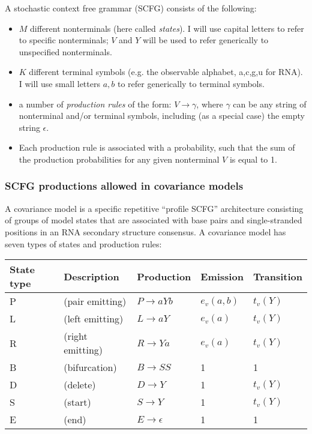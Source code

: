\documentclass[11pt]{article}
\begin{document}
A stochastic context free grammar (SCFG) consists of the following:

\begin{itemize}
\item $M$ different nonterminals (here called \emph{states}). I will use capital
      letters to refer to specific nonterminals; $V$ and $Y$ will be used
      to refer generically to unspecified nonterminals.
\item $K$ different terminal symbols (e.g. the observable alphabet,
      {a,c,g,u} for RNA). I will use small letters $a,b$ to refer
      generically to terminal symbols.
\item a number of \emph{production rules} of the form: $V \rightarrow
\gamma$, where $\gamma$ can be any string of nonterminal and/or
terminal symbols, including (as a special case) the empty string
$\epsilon$.
\item Each production rule is associated with a probability, such that
      the sum of the production probabilities for any given
      nonterminal $V$ is equal to 1.
\end{itemize} 

\subsubsection{SCFG productions allowed in covariance models}

A covariance model is a specific repetitive ``profile SCFG''
architecture consisting of groups of model states that are associated
with base pairs and single-stranded positions in an RNA secondary
structure consensus. A covariance model has seven types of states and
production rules:

\vspace{0.5em}
\begin{tabular}{lllll}
State type & Description             &  Production             & Emission & Transition\\ \hline
P & (pair emitting)   & $P \rightarrow a Y b$ & $e_v(a,b)$ & $t_v(Y)$  \\
L & (left emitting)   & $L \rightarrow a Y$   & $e_v(a)$   & $t_v(Y)$  \\
R & (right emitting)  & $R \rightarrow Y a$   & $e_v(a)$   & $t_v(Y)$  \\
B & (bifurcation)     & $B \rightarrow S S$   & 1     &     1     \\
D & (delete)          & $D \rightarrow Y$     & 1     &   $t_v(Y)$  \\
S & (start)           & $S \rightarrow Y$     &    1     & $t_v(Y)$  \\
E & (end)             & $E \rightarrow \epsilon$ & 1     &     1     \\
\end{tabular}
\vspace{0.5em}
\end{document}
